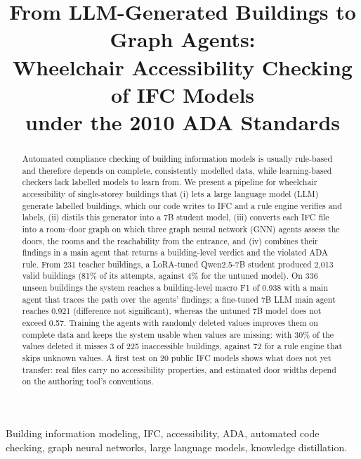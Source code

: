 \documentclass[conference]{IEEEtran}
\begin{document}
\title{From LLM-Generated Buildings to Graph Agents:\\Wheelchair Accessibility Checking of IFC Models\\under the 2010 ADA Standards}

\author{
}

\maketitle

\begin{abstract}
Automated compliance checking of building information models is usually rule-based and therefore depends on
complete, consistently modelled data, while learning-based checkers lack labelled models to learn from. We present
a pipeline for wheelchair accessibility of single-storey buildings that (i) lets a large language model (LLM)
generate labelled buildings, which our code writes to IFC and a rule engine verifies and labels, (ii) distils this
generator into a 7B student model, (iii) converts each IFC file into a room--door graph on which three graph neural
network (GNN) agents assess the doors, the rooms and the reachability from the entrance, and (iv) combines their
findings in a main agent that returns a building-level verdict and the violated ADA rule. From 231 teacher
buildings, a LoRA-tuned Qwen2.5-7B student produced 2,013 valid buildings (81\% of its attempts, against 4\% for the
untuned model). On 336 unseen buildings the system reaches a building-level macro F1 of 0.938 with a main agent that
traces the path over the agents' findings; a fine-tuned 7B LLM main agent reaches 0.921 (difference not
significant), whereas the untuned 7B model does not exceed 0.57. Training the agents with randomly deleted values
improves them on complete data and keeps the system usable when values are missing: with 30\% of the values
deleted it misses 3 of 225 inaccessible buildings, against 72 for a rule engine that skips unknown values. A first
test on 20 public IFC models shows what does not yet transfer: real files carry no accessibility properties, and
estimated door widths depend on the authoring tool's conventions.
\end{abstract}

\begin{IEEEkeywords}
Building information modeling, IFC, accessibility, ADA, automated code checking, graph neural networks,
large language models, knowledge distillation.
\end{IEEEkeywords}
\end{document}
